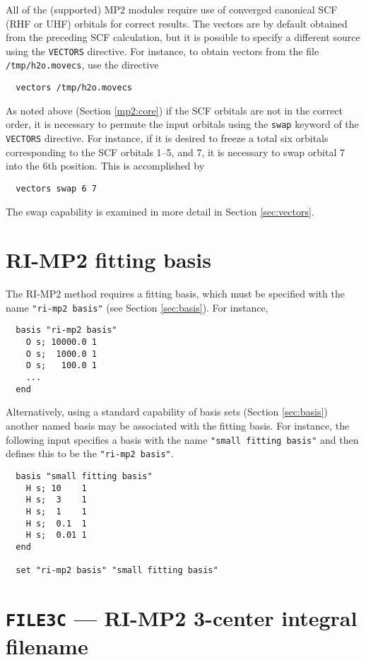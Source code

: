 All of the (supported) MP2 modules require use of converged canonical
SCF (RHF or UHF) orbitals for correct results.  The vectors are by
default obtained from the preceding SCF calculation, but it is
possible to specify a different source using the \verb+VECTORS+
directive.  For instance, to obtain vectors from the file
\verb+/tmp/h2o.movecs+, use the directive
\begin{verbatim}
  vectors /tmp/h2o.movecs
\end{verbatim}

As noted above (Section \ref{mp2:core}) if the SCF orbitals are not in
the correct order, it is necessary to permute the input orbitals using
the \verb+swap+ keyword of the \verb+VECTORS+ directive.  For
instance, if it is desired to freeze a total six orbitals
corresponding to the SCF orbitals 1--5, and 7, it is necessary to swap
orbital 7 into the 6th position.  This is accomplished by
\begin{verbatim}
  vectors swap 6 7
\end{verbatim}
The swap capability is examined in more detail in Section
\ref{sec:vectors}.


\section{RI-MP2 fitting basis}

\sloppy

The RI-MP2 method requires a fitting basis, which must be specified
with the name \verb+"ri-mp2 basis"+ (see Section \ref{sec:basis}).
For instance,
\begin{verbatim}
  basis "ri-mp2 basis"
    O s; 10000.0 1
    O s;  1000.0 1
    O s;   100.0 1
    ...
  end
\end{verbatim}

Alternatively, using a standard capability of basis sets (Section
\ref{sec:basis}) another named basis may be associated with the
fitting basis.  For instance, the following input specifies a basis
with the name \verb+"small fitting basis"+ and then defines this to be
the \verb+"ri-mp2 basis"+.
\begin{verbatim}
  basis "small fitting basis"
    H s; 10    1
    H s;  3    1
    H s;  1    1
    H s;  0.1  1
    H s;  0.01 1
  end

  set "ri-mp2 basis" "small fitting basis"
\end{verbatim}

\fussy


\section{{\tt FILE3C} --- RI-MP2 3-center integral filename}

